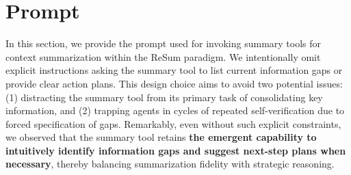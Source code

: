 \clearpage
\newpage

\section{Prompt}\label{appendix:prompt}

In this section, we provide the prompt used for invoking summary tools for context summarization within the ReSum paradigm. We intentionally omit explicit instructions asking the summary tool to list current information gaps or provide clear action plans. This design choice aims to avoid two potential issues: (1) distracting the summary tool from its primary task of consolidating key information, and (2) trapping agents in cycles of repeated self-verification due to forced specification of gaps. Remarkably, even without such explicit constraints, we observed that the summary tool retains \textbf{the emergent capability to intuitively identify information gaps and suggest next-step plans when necessary}, thereby balancing summarization fidelity with strategic reasoning.

